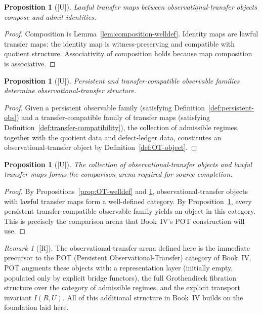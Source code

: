 \documentclass[12pt,oneside]{amsbook}
\theoremstyle{plain}
\newtheorem{proposition}[theorem]{Proposition}
\theoremstyle{definition}
\theoremstyle{remark}
\newtheorem{remark}[theorem]{Remark}
\newcommand{\status}[1]{\textup{[#1]}}
\begin{document}
\begin{proposition}[\status{U}]\label{prop:OT-morphisms}
Lawful transfer maps between observational-transfer objects compose
and admit identities.
\end{proposition}

\begin{proof}
Composition is Lemma~\ref{lem:composition-welldef}.  Identity maps
are lawful transfer maps: the identity map is witness-preserving and
compatible with quotient structure.  Associativity of composition
holds because map composition is associative.
\end{proof}

\begin{proposition}[\status{U}]\label{prop:OT-from-compat}
Persistent and transfer-compatible observable families determine
observational-transfer structure.
\end{proposition}

\begin{proof}
Given a persistent observable family (satisfying
Definition~\ref{def:persistent-obs}) and a transfer-compatible family
of transfer maps (satisfying Definition~\ref{def:transfer-compatibility}),
the collection of admissible regimes, together with the quotient data
and defect-ledger data, constitutes an observational-transfer object
by Definition~\ref{def:OT-object}.
\end{proof}

\begin{proposition}[\status{U}]\label{prop:OT-arena}
The collection of observational-transfer objects and lawful transfer
maps forms the comparison arena required for source completion.
\end{proposition}

\begin{proof}
By Propositions~\ref{prop:OT-welldef} and \ref{prop:OT-morphisms},
observational-transfer objects with lawful transfer maps form a
well-defined category.  By Proposition~\ref{prop:OT-from-compat},
every persistent transfer-compatible observable family yields an
object in this category.  This is precisely the comparison arena
that Book~IV's POT construction will use.
\end{proof}

\begin{remark}[\status{R}]\label{rmk:OT-to-POT}
The observational-transfer arena defined here is the immediate
precursor to the POT (Persistent Observational-Transfer) category of
Book~IV.  POT augments these objects with: a representation layer
(initially empty, populated only by explicit bridge functors), the
full Grothendieck fibration structure over the category of admissible
regimes, and the explicit transport invariant $I(R,U)$.  All of this
additional structure in Book~IV builds on the foundation laid here.
\end{remark}
\end{document}
